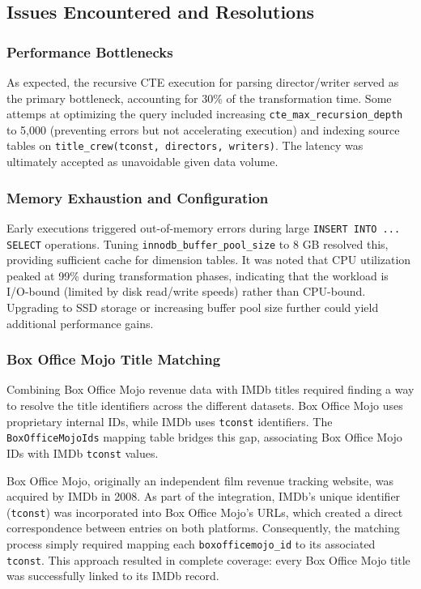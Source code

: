 \subsection{Issues Encountered and Resolutions}

\subsubsection{Performance Bottlenecks}

As expected, the recursive CTE execution for parsing director/writer served as the primary bottleneck, accounting for 30\% of the transformation time. Some attemps at optimizing the query included increasing \texttt{cte\_max\_recursion\_depth} to 5,000 (preventing errors but not accelerating execution) and indexing source tables on \texttt{title\_crew(tconst, directors, writers)}. The latency was ultimately accepted as unavoidable given data volume.

\subsubsection{Memory Exhaustion and Configuration}

Early executions triggered out-of-memory errors during large \texttt{INSERT INTO ... SELECT} operations. Tuning \texttt{innodb\_buffer\_pool\_size} to 8 GB resolved this, providing sufficient cache for dimension tables. It was noted that CPU utilization peaked at 99\% during transformation phases, indicating that the workload is I/O-bound (limited by disk read/write speeds) rather than CPU-bound. Upgrading to SSD storage or increasing buffer pool size further could yield additional performance gains.

\subsubsection{Box Office Mojo Title Matching}

Combining Box Office Mojo revenue data with IMDb titles required finding a way to resolve the title identifiers across the different datasets. Box Office Mojo uses proprietary internal IDs, while IMDb uses \texttt{tconst} identifiers. The \texttt{BoxOfficeMojoIds} mapping table bridges this gap, associating Box Office Mojo IDs with IMDb \texttt{tconst} values.

Box Office Mojo, originally an independent film revenue tracking website, was acquired by IMDb in 2008. As part of the integration, IMDb’s unique identifier (\texttt{tconst}) was incorporated into Box Office Mojo’s URLs, which created a direct correspondence between entries on both platforms. Consequently, the matching process simply required mapping each \texttt{boxofficemojo\_id} to its associated \texttt{tconst}. This approach resulted in complete coverage: every Box Office Mojo title was successfully linked to its IMDb record.